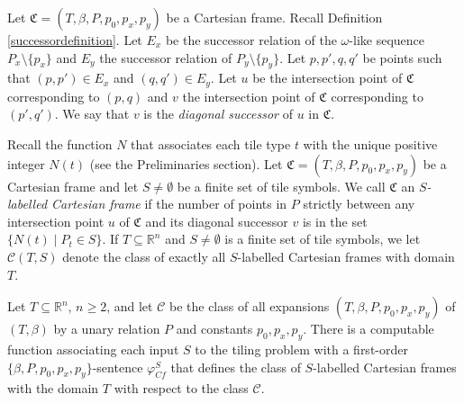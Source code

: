 \documentclass{LMCS}
\theoremstyle{plain}
\newcommand{\rsq}{\mathbb{R}^n}
\newcommand{\mf}{\mathfrak}
\newcommand{\mi}{\mathit}
\begin{document}
%
\begin{defi}\label{diagonalsuccessordefinition}
%
Let $\mf{C}=(T,\beta,P,p_0,p_x,p_y)$ be a Cartesian frame.
%
Recall Definition \ref{successordefinition}.
%
Let $E_x$ be the successor relation of the $\omega$-like sequence $P_x\setminus\{p_x\}$ and $E_y$ the
%
successor relation of $P_y\setminus\{p_y\}$. Let $p,p',q,q'$ be points
%
such that $(p,p')\in E_x$ and $(q,q')\in E_y$.
%
Let $u$ be the intersection point of $\mf{C}$ corresponding to $(p,q)$ and $v$ the
%
intersection point of $\mf{C}$ corresponding to $(p',q')$.
%
We say that $v$ is the \emph{diagonal successor} of $u$ in $\mf{C}$.
%
\end{defi}
%
%
%
\begin{defi}
%
Recall the function $N$ that associates each tile type $t$ with the unique positive integer $N(t)$ (see the 
%
Preliminaries section).
%
Let $\mf{C}=(T,\beta,P,p_0,p_x,p_y)$ be a Cartesian frame and let $S\not=\emptyset$ be a finite set of tile symbols.
We call $\mf{C}$ an \emph{$S$-labelled Cartesian frame} if the number of points in $P$ strictly between
any intersection point $u$ of $\mf{C}$ and its diagonal successor $v$ is in the set $\{N(t)\mid P_t\in S\}$.
%
If $T\subseteq\rsq$ and $S\not=\emptyset$ is a finite set of tile symbols, we let
$\mathcal{C}(T,S)$ denote the class of exactly all $S$-labelled Cartesian frames with domain $T$.
%
\end{defi}
%
%
%
%
%
%
\begin{lem}\label{boxedcartesianpicturesdefinablelemma}
%
Let $T\subseteq\rsq$, $n\geq 2$, and let $\mathcal{C}$ be the class of all expansions $(T,\beta,P,p_0,p_x,p_y)$ of $(T,\beta)$ by
%
a unary relation $P$ and constants $p_0,p_x,p_y$.
%
There is a computable function associating each input $S$ to the tiling problem
%
with a first-order $\{\beta, P,p_0,p_x,p_y\}$-sentence $\varphi_\mi{Cf}^S$ that
defines the class of $S$-labelled Cartesian frames with the domain $T$
%
with respect to the class $\mathcal{C}$.
%
\end{lem}
\end{document}
